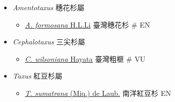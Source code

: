 
  \begin{itemize}
 \item[] \textit{Amentotaxus} 穗花杉屬
                            
  \begin{itemize}
        \item[] \href{http://www.theplantlist.org/tpl1.1/search?q=Amentotaxus+formosana}{\textit{A. formosana} H.L.Li}   臺灣穗花杉  \# EN
  \end{itemize}
 \item[] \textit{Cephalotaxus} 三尖杉屬
                            
  \begin{itemize}
        \item[] \href{http://www.theplantlist.org/tpl1.1/search?q=Cephalotaxus+wilsoniana}{\textit{C. wilsoniana} Hayata}   臺灣粗榧  \# VU
  \end{itemize}
 \item[] \textit{Taxus} 紅豆杉屬
                            
  \begin{itemize}
        \item[] \href{http://www.theplantlist.org/tpl1.1/search?q=Taxus+sumatrana}{\textit{T. sumatrana} (Miq.) de Laub.}   南洋紅豆杉   EN
  \end{itemize}
  \end{itemize}
